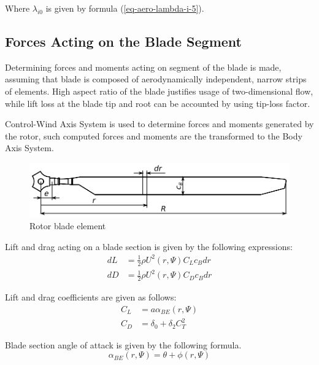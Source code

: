 Where $\lambda_{i0}$ is given by formula (\ref{eq-aero-lambda-i-5}).

\subsection{Forces Acting on the Blade Segment}

Determining forces and moments acting on segment of the blade is made, assuming that blade is composed of aerodynamically independent, narrow strips of elements. \cite{Stepniewski1984} High aspect ratio of the blade justifies usage of two-dimensional flow, while lift loss at the blade tip and root can be accounted by using tip-loss factor. \cite{Padfield2007, Stepniewski1984, Bramwell2001}

Control-Wind Axis System is used to determine forces and moments generated by the rotor, such computed forces and moments are the transformed to the Body Axis System.

\begin{figure}[h!]
  \centering
  \includegraphics[width=120mm]{images/blade_element_theory_01.eps}
  \caption{Rotor blade element}
\end{figure}

Lift and drag acting on a blade section is given by the following expressions:
\begin{align}
  \label{eq-aero-blade-section-lift}
  dL &= \frac{1}{2} \rho U^2 \left( r, \Psi \right) C_L c_B dr \\
  \label{eq-aero-blade-section-drag}
  dD &= \frac{1}{2} \rho U^2 \left( r, \Psi \right) C_D c_B dr
\end{align}

Lift and drag coefficients are given as follows: \cite{Padfield2007}
\begin{align}
  \label{eq-aero-blade-section-lift-coef}
  C_L &= a \alpha_{BE} \left( r, \Psi \right) \\
  C_D &= \delta_0 + \delta_2 C_T^2
\end{align}

Blade section angle of attack is given by the following formula.
\begin{equation}
  \alpha_{BE} \left( r , \Psi \right) = \theta + \phi \left( r , \Psi \right) 
\end{equation}

